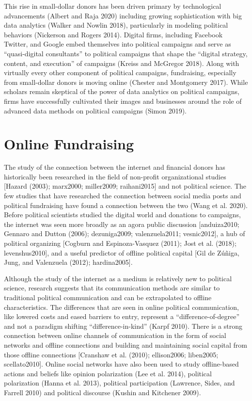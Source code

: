 \documentclass[12pt,]{article}
\begin{document}
This rise in small-dollar donors has been driven primary by
technological advancements (Albert and Raja 2020) including growing
sophistication with big data analytics (Walker and Nowlin 2018),
particularly in modeling political behaviors (Nickerson and Rogers
2014). Digital firms, including Facebook Twitter, and Google embed
themselves into political campaigns and serve as ``quasi-digital
consultants'' to political campaigns that shape the ``digital strategy,
content, and execution'' of campaigns (Kreiss and McGregor 2018). Along
with virtually every other component of political campaigns,
fundraising, especially from small-dollar donors is moving online
(Chester and Montgomery 2017). While scholars remain skeptical of the
power of data analytics on political campaigns, firms have successfully
cultivated their images and businesses around the role of advanced data
methods on political campaigns (Simon 2019).

\hypertarget{online-fundraising}{%
\section{Online Fundraising}\label{online-fundraising}}

The study of the connection between the internet and financial donors
has historically been researched in the field of non-profit
organizational studies {[}Hazard (2003); marx2000; miller2009;
raihani2015{]} and not political science. The few studies that have
researched the connection between social media posts and political
fundraising have found a connection between the two (Wang et al. 2020).
Before political scientists studied the digital world and donations to
campaigns, the internet was seen more broadly as an agora public
discussion {[}anduiza2010; Gennaro and Dutton (2006); dezuniga2009;
valenzuela2011; vesnic2012{]}, a hub of political organizing {[}Cogburn
and Espinoza-Vasquez (2011); Jost et al. (2018); levenshus2010{]}, and a
useful predictor of offline political capital {[}Gil de Zúñiga, Jung,
and Valenzuela (2012); hardina2005{]}.

Although the study of the internet as a medium is relatively new to
political science, research suggests that its communication methods are
similar to traditional political communication and can be extrapolated
to offline characteristics. The differences that are seen in online
political communication, like lowered costs and eased barriers to entry,
represent a ``difference-of-degree'' and not a paradigm shifting
``difference-in-kind'' (Karpf 2010). There is a strong connection
between online channels of communication in the form of social networks
and offline connections and building and maintaining social capital from
those offline connections {[}Cranshaw et al. (2010); ellison2006;
liben2005; scellato2010{]}. Online social networks have also been used
to study offline-based actions and beliefs like opinion polarization
(Lee et al. 2014), political polarization (Hanna et al. 2013), political
participation (Lawrence, Sides, and Farrell 2010) and political
discourse (Kushin and Kitchener 2009).
\end{document}
